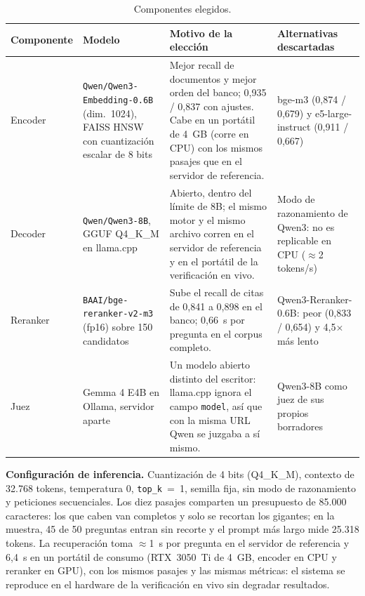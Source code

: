 \documentclass[10pt,twocolumn,letterpaper]{article}
\newcommand{\cod}[1]{\texttt{#1}}
\begin{document}
\begin{table}[t]
\centering\footnotesize
\caption{Componentes elegidos.}
\label{tab:componentes}
\begin{tabularx}{\textwidth}{@{}l>{\raggedright\arraybackslash}p{4.1cm}>{\raggedright\arraybackslash}X>{\raggedright\arraybackslash}p{4.4cm}@{}}
\toprule
Componente & Modelo & Motivo de la elección & Alternativas descartadas \\
\midrule
Encoder & \cod{Qwen/Qwen3-Embedding-0.6B} (dim.\ 1024), FAISS HNSW con cuantización
escalar de 8 bits &
Mejor recall de documentos y mejor orden del banco; 0,935 / 0,837 con ajustes. Cabe en
un portátil de 4~GB (corre en CPU) con los mismos pasajes que en el servidor de
referencia. &
bge-m3 (0,874 / 0,679) y e5-large-instruct (0,911 / 0,667) \\
Decoder & \cod{Qwen/Qwen3-8B}, GGUF Q4\_K\_M en llama.cpp &
Abierto, dentro del límite de 8B; el mismo motor y el mismo archivo corren en el
servidor de referencia y en el portátil de la verificación en vivo. &
Modo de razonamiento de Qwen3: no es replicable en CPU ($\approx$2 tokens/s) \\
Reranker & \cod{BAAI/bge-reranker-v2-m3} (fp16) sobre 150 candidatos &
Sube el recall de citas de 0,841 a 0,898 en el banco; 0,66~s por pregunta en el corpus
completo. &
Qwen3-Reranker-0.6B: peor (0,833 / 0,654) y 4,5$\times$ más lento \\
Juez & Gemma 4 E4B en Ollama, servidor aparte &
Un modelo abierto distinto del escritor: llama.cpp ignora el campo \cod{model}, así que
con la misma URL Qwen se juzgaba a sí mismo. &
Qwen3-8B como juez de sus propios borradores \\
\bottomrule
\end{tabularx}
\end{table}

\textbf{Configuración de inferencia.} Cuantización de 4 bits (Q4\_K\_M), contexto de
32.768 tokens, temperatura 0, \cod{top\_k}~=~1, semilla fija, sin modo de razonamiento y
peticiones secuenciales. Los diez pasajes comparten un presupuesto de 85.000 caracteres:
los que caben van completos y solo se recortan los gigantes; en la muestra, 45 de 50
preguntas entran sin recorte y el prompt más largo mide 25.318 tokens. La recuperación
toma $\approx$1~s por pregunta en el servidor de referencia y 6,4~s en un portátil de
consumo (RTX~3050~Ti de 4~GB, encoder en CPU y reranker en GPU), con los mismos pasajes
y las mismas métricas: el sistema se reproduce en el hardware de la verificación en vivo
sin degradar resultados. %
\end{document}
